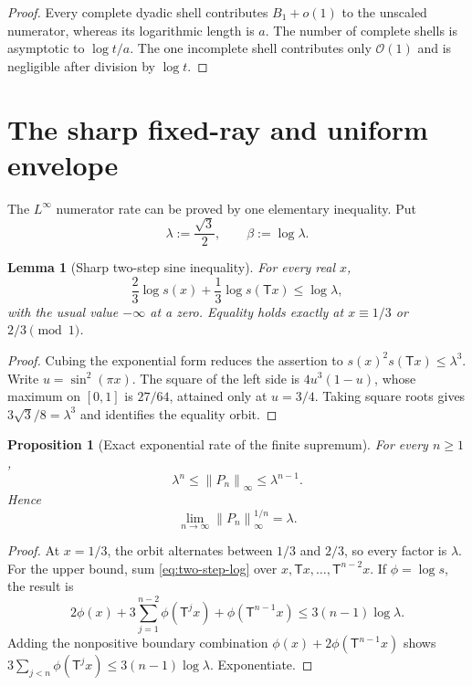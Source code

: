 \documentclass[11pt,oneside]{article}
\newtheorem{proposition}[theorem]{Proposition}
\newtheorem{lemma}[theorem]{Lemma}
\theoremstyle{definition}
\theoremstyle{remark}
\newcommand{\bigO}{\mathcal O}
\newcommand{\T}{\mathsf T}
\newcommand{\norm}[1]{\left\lVert#1\right\rVert}
\begin{document}
\begin{proof}
Every complete dyadic shell contributes $B_1+o(1)$ to the unscaled numerator,
whereas its logarithmic length is $a$.  The number of complete shells is
asymptotic to $\log t/a$.  The one incomplete shell contributes only
$\bigO(1)$ and is negligible after division by $\log t$.
\end{proof}

\section{The sharp fixed-ray and uniform envelope}
\label{sec:extremal}

The $L^\infty$ numerator rate can be proved by one elementary inequality.  Put
\begin{equation}
 \lambda:=\frac{\sqrt3}{2},
 \qquad
 \beta:=\log\lambda.
 \label{eq:lambda-beta}
\end{equation}

\begin{lemma}[Sharp two-step sine inequality]
\label{lem:two-step}
For every real $x$,
\begin{equation}
 \frac23\log s(x)+\frac13\log s(\T x)
 \le\log\lambda,
 \label{eq:two-step-log}
\end{equation}
with the usual value $-\infty$ at a zero.  Equality holds exactly at
$x\equiv1/3$ or $2/3\pmod1$.
\end{lemma}

\begin{proof}
Cubing the exponential form reduces the assertion to
$s(x)^2s(\T x)\le\lambda^3$.  Write
$u=\sin^2(\pi x)$.  The square of the left side is
$4u^3(1-u)$, whose maximum on $[0,1]$ is $27/64$, attained only at
$u=3/4$.  Taking square roots gives
$3\sqrt3/8=\lambda^3$ and identifies the equality orbit.
\end{proof}

\begin{proposition}[Exact exponential rate of the finite supremum]
\label{prop:Pn-sup}
For every $n\ge1$,
\begin{equation}
 \lambda^n\le\norm{P_n}_\infty\le\lambda^{n-1}.
 \label{eq:Pn-sup}
\end{equation}
Hence
\begin{equation}
 \lim_{n\to\infty}\norm{P_n}_\infty^{1/n}=\lambda.
 \label{eq:Gelfond-rate}
\end{equation}
\end{proposition}

\begin{proof}
At $x=1/3$, the orbit alternates between $1/3$ and $2/3$, so every factor is
$\lambda$.  For the upper bound, sum \eqref{eq:two-step-log} over
$x,\T x,\ldots,\T^{n-2}x$.  If $\phi=\log s$, the result is
\[
 2\phi(x)+3\sum_{j=1}^{n-2}\phi(\T^jx)
 +\phi(\T^{n-1}x)\le3(n-1)\log\lambda.
\]
Adding the nonpositive boundary combination
$\phi(x)+2\phi(\T^{n-1}x)$ shows
$3\sum_{j<n}\phi(\T^jx)\le3(n-1)\log\lambda$.
Exponentiate.
\end{proof}
\end{document}
